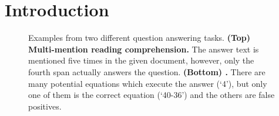 \documentclass[11pt,a4paper]{article}
\begin{document}
\newcommand{\bert}{\textsc{BERT}}
\newcommand{\qanet}{\textsc{QANet}}

\newcommand{\hred}[2]{{\cellcolor[rgb]{1,#1,#1} #2}}
\newcommand{\hdred}[2]{\cellcolor[rgb]{#1,0,0} {\protect\color{white}{#2}}}
\newcommand{\tred}[1]{{\color[rgb]{1,0,0} {#1}}}
\newcommand{\tblue}[1]{{\color[rgb]{0,0,1} {#1}}}

\providecommand{\tspan}[1]{
    {\protect\color{purple}{#1}}
}
\providecommand{\tnumber}[1]{
    {\protect\color{purple}{\textbf{\texttt{#1}}}}
} \begin{abstract}
    \myabstract
\end{abstract}

\section{Introduction}\label{sec:intro}\begin{figure}[!thb]
\centering
{}
\caption{Examples from two different question answering tasks. \textbf{(Top) Multi-mention reading comprehension.} The answer text is mentioned five times in the given document, however, only the fourth span actually answers the question. \textbf{(Bottom) \discrete.} There are many potential equations which execute the answer (`4'), but only one of them is the correct equation (`40-36') and the others are false positives.
}
\label{fig:example}\end{figure}
\end{document}
